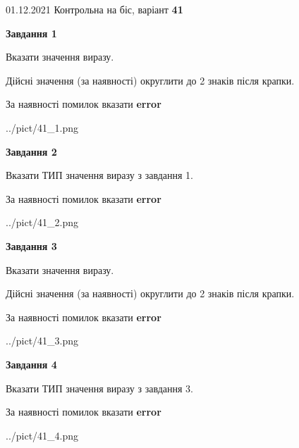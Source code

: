 \documentclass[11pt, ukrainian]{article}
\begin{document}
{01.12.2021 Контрольна на біс, варіант  \No \textbf { 41 }\par}
{
\begin {large}
{\begin {center}\textbf{Завдання 1}\end {center}}\par
Вказати значення виразу. \par
Дійсні значення (за наявності) округлити до 2 знаків після крапки. \par
За наявності помилок вказати \textbf{error}

\begin{center}
	{../pict/41_1.png}
\end{center}
\newpage

{\begin {center}\textbf{Завдання 2}\end {center}}\par
Вказати ТИП значення виразу з завдання 1. \par
За наявності помилок вказати \textbf{error}

\begin{center}
	{../pict/41_2.png}
\end{center}
\newpage

{\begin {center}\textbf{Завдання 3}\end {center}}\par
Вказати значення виразу. \par
Дійсні значення (за наявності) округлити до 2 знаків після крапки. \par
За наявності помилок вказати \textbf{error}

\begin{center}
	{../pict/41_3.png}
\end{center}
\newpage

{\begin {center}\textbf{Завдання 4}\end {center}}\par
Вказати ТИП значення виразу з завдання 3. \par
За наявності помилок вказати \textbf{error}

\begin{center}
	{../pict/41_4.png}
\end{center}
\newpage


\end{large}}
\end{document}
